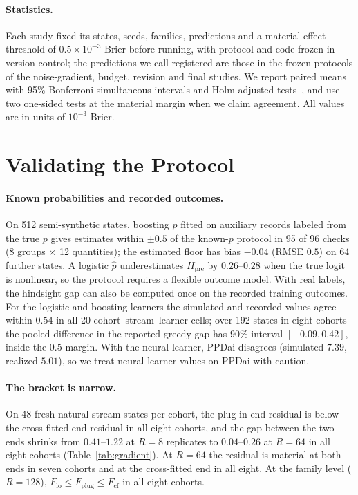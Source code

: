 \documentclass[runningheads]{llncs}
\newcommand{\Hpre}{H_{\mathrm{pre}}}
\begin{document}
\paragraph{Statistics.} Each study fixed its states, seeds, families, predictions and a material-effect threshold of $0.5\times10^{-3}$ Brier before running, with protocol and code frozen in version control; the predictions we call registered are those in the frozen protocols of the noise-gradient, budget, revision and final studies. We report paired means with 95\% Bonferroni simultaneous intervals and Holm-adjusted tests~\cite{holm1979simple}, and use two one-sided tests at the material margin when we claim agreement. All values are in units of $10^{-3}$ Brier.

\section{Validating the Protocol}
\label{sec:validation}
\paragraph{Known probabilities and recorded outcomes.} On 512 semi-synthetic states, boosting $\hat p$ fitted on auxiliary records labeled from the true $p$ gives estimates within $\pm0.5$ of the known-$p$ protocol in 95 of 96 checks (8 groups $\times$ 12 quantities); the estimated floor has bias $-0.04$ (RMSE $0.5$) on 64 further states. A logistic $\hat p$ underestimates $\Hpre$ by $0.26$--$0.28$ when the true logit is nonlinear, so the protocol requires a flexible outcome model. With real labels, the hindsight gap can also be computed once on the recorded training outcomes. For the logistic and boosting learners the simulated and recorded values agree within $0.54$ in all 20 cohort--stream--learner cells; over 192 states in eight cohorts the pooled difference in the reported greedy gap has 90\% interval $[-0.09,0.42]$, inside the $0.5$ margin. With the neural learner, PPDai disagrees (simulated $7.39$, realized $5.01$), so we treat neural-learner values on PPDai with caution.

\paragraph{The bracket is narrow.} On 48 fresh natural-stream states per cohort, the plug-in-end residual is below the cross-fitted-end residual in all eight cohorts, and the gap between the two ends shrinks from $0.41$--$1.22$ at $R=8$ replicates to $0.04$--$0.26$ at $R=64$ in all eight cohorts (Table~\ref{tab:gradient}). At $R=64$ the residual is material at both ends in seven cohorts and at the cross-fitted end in all eight. At the family level ($R=128$), $F_{\mathrm{lo}}\le F_{\mathrm{plug}}\le F_{\mathrm{cf}}$ in all eight cohorts.
\end{document}
